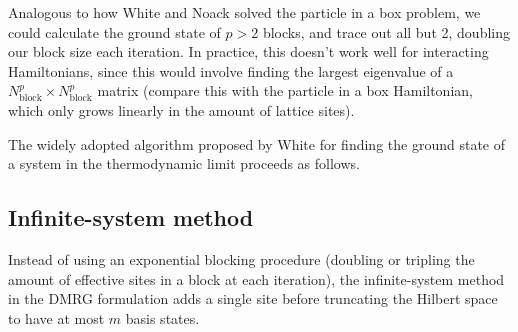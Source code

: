 Analogous to how White and Noack solved the particle in a box problem, we could
calculate the ground state of $p > 2$ blocks,
and trace out all but 2, doubling our block size each iteration. In
practice, this doesn't work well for interacting Hamiltonians, since this
would involve finding the largest eigenvalue of a $N_{\text{block}}^p
\times N_{\text{block}}^p$ matrix (compare this with the particle in a box
Hamiltonian, which only grows linearly in the amount of lattice sites).

The widely adopted algorithm proposed by White \cite{white1993density} for
finding the ground state of a system in the thermodynamic limit proceeds
as follows.

\subsection{Infinite-system method}

 
Instead of using an exponential blocking procedure (doubling or tripling the
amount of effective sites in a block at each iteration), the infinite-system
method in the DMRG formulation adds a single site before truncating the Hilbert
space to have at most $m$ basis states.

